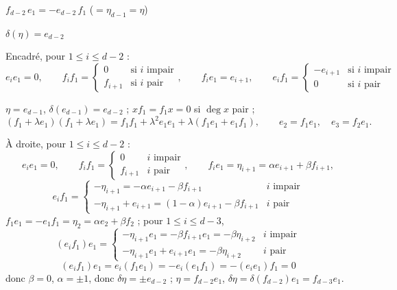 \documentclass[11pt,a4paper]{article}
\begin{document}

$f_{d-2}\,e_1 = -e_{d-2}\,f_1$ ($=\eta_{d-1} = \eta$)

$\delta(\eta) = e_{d-2}$

Encadré, pour $1\leq i\leq d-2$ :
\[
e_i e_1 = 0, \qquad
f_i f_1 = \begin{cases} 0 & \text{si } i \text{ impair}\\
f_{i+1} & \text{si } i \text{ pair}\end{cases}, \qquad
f_i e_1 = e_{i+1}, \qquad
e_i f_1 = \begin{cases} -e_{i+1} & \text{si } i \text{ impair}\\
0 & \text{si } i \text{ pair}\end{cases}
\]

$\eta = e_{d-1}$, $\delta(e_{d-1}) = e_{d-2}$ ; $x f_1 = f_1 x = 0$ si
$\deg x$ pair ;
\[
(f_1+\lambda e_1)(f_1+\lambda e_1) = f_1f_1 + \lambda^2 e_1e_1 +
\lambda(f_1e_1 + e_1f_1), \qquad e_2 = f_1e_1, \quad e_3 = f_2e_1 .
\]

À droite, pour $1\leq i\leq d-2$ :
\[
e_ie_1 = 0,\qquad f_if_1 = \begin{cases} 0 & i \text{ impair}\\
f_{i+1} & i \text{ pair}\end{cases},\qquad
f_ie_1 = \eta_{i+1} = \alpha e_{i+1} + \beta f_{i+1},
\]
\[
e_if_1 = \begin{cases} -\eta_{i+1} = -\alpha e_{i+1} - \beta f_{i+1} &
i \text{ impair}\\
-\eta_{i+1} + e_{i+1} = (1-\alpha)e_{i+1} - \beta f_{i+1} & i \text{ pair}
\end{cases}
\]
$f_1e_1 = -e_1f_1 = \eta_2 = \alpha e_2 + \beta f_2$ ; pour
$1\leq i\leq d-3$,
\[
(e_if_1)e_1 = \begin{cases} -\eta_{i+1}e_1 = -\beta f_{i+1}e_1 =
-\beta\eta_{i+2} & i \text{ impair}\\
-\eta_{i+1}e_1 + e_{i+1}e_1 = -\beta\eta_{i+2} & i \text{ pair}\end{cases}
\]
\[
(e_if_1)e_1 = e_i(f_1e_1) = -e_i(e_1f_1) = -(e_ie_1)f_1 = 0
\]
donc $\beta=0$, $\alpha=\pm 1$, donc $\delta\eta = \pm e_{d-2}$ ;
$\eta = f_{d-2}e_1$, $\delta\eta = \delta(f_{d-2})e_1 = f_{d-3}e_1$.
\end{document}
